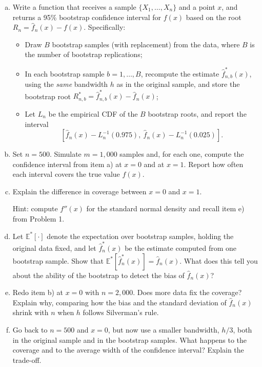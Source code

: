 \documentclass[11pt]{article}
\theoremstyle{definition}
\newcommand{\E}{\mathbb{E}}
\begin{document}
\begin{enumerate}[a)]
	\item Write a function that receives a sample $\{X_1, \dots, X_n\}$ and a point $x$, and returns a 95\% bootstrap confidence interval for $f(x)$ based on the root $R_n = \hat{f}_n(x) - f(x)$. Specifically:
	\begin{itemize}
		\item Draw $B$ bootstrap samples (with replacement) from the data, where $B$ is the number of bootstrap replications;
		\item In each bootstrap sample $b = 1, \dots, B$, recompute the estimate $\hat{f}^*_{n,b}(x)$, using the \textit{same} bandwidth $h$ as in the original sample, and store the bootstrap root $R^*_{n,b} = \hat{f}^*_{n,b}(x) - \hat{f}_n(x)$;
		\item Let $L_n$ be the empirical CDF of the $B$ bootstrap roots, and report the interval
		\[
		\left[\hat{f}_n(x) - L_n^{-1}(0.975),\ \hat{f}_n(x) - L_n^{-1}(0.025)\right].
		\]
	\end{itemize}

	\item Set $n = 500$. Simulate $m = 1{,}000$ samples and, for each one, compute the confidence interval from item a) at $x = 0$ and at $x = 1$. Report how often each interval covers the true value $f(x)$.

	\item Explain the difference in coverage between $x = 0$ and $x = 1$.

	Hint: compute $f''(x)$ for the standard normal density and recall item e) from Problem 1.

	\item Let $\E^*[\cdot]$ denote the expectation over bootstrap samples, holding the original data fixed, and let $\hat{f}^*_n(x)$ be the estimate computed from one bootstrap sample. Show that $\E^*[\hat{f}^*_n(x)] = \hat{f}_n(x)$. What does this tell you about the ability of the bootstrap to detect the bias of $\hat{f}_n(x)$?

	\item Redo item b) at $x = 0$ with $n = 2{,}000$. Does more data fix the coverage? Explain why, comparing how the bias and the standard deviation of $\hat{f}_n(x)$ shrink with $n$ when $h$ follows Silverman's rule.

	\item Go back to $n = 500$ and $x = 0$, but now use a smaller bandwidth, $h/3$, both in the original sample and in the bootstrap samples. What happens to the coverage and to the average width of the confidence interval? Explain the trade-off.
\end{enumerate}
\end{document}
